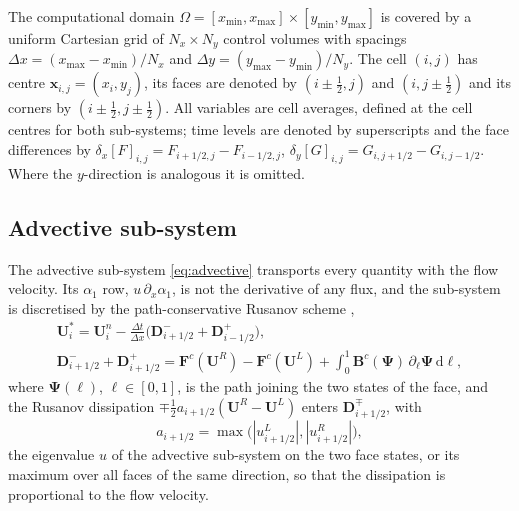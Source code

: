 The computational domain $\Omega=[x_{\min},x_{\max}]\times[y_{\min},y_{\max}]$ is covered by a uniform Cartesian grid of
$N_x\times N_y$ control volumes with spacings $\Delta x=(x_{\max}-x_{\min})/N_x$ and $\Delta y=(y_{\max}-y_{\min})/N_y$. The cell $(i,j)$ has
centre $\mathbf x_{i,j}=(x_i,y_j)$, its faces are denoted by $(i\pm\tfrac12,j)$ and $(i,j\pm\tfrac12)$ and its corners by
$(i\pm\tfrac12,j\pm\tfrac12)$. All variables are cell averages, defined at the cell centres for both sub-systems; time levels
are denoted by superscripts and the face differences by $\delta_x[F]_{i,j}=F_{i+1/2,j}-F_{i-1/2,j}$,
$\delta_y[G]_{i,j}=G_{i,j+1/2}-G_{i,j-1/2}$. Where the $y$-direction is analogous it is omitted.

\subsection{Advective sub-system}
\label{sec:advective}
The advective sub-system \eqref{eq:advective} transports every quantity with the flow velocity. Its $\alpha_1$ row,
$u\,\partial_x\alpha_1$, is not the derivative of any flux, and the sub-system is discretised by the path-conservative Rusanov scheme
\cite{DalMaso1995,Pares2006,Castro2006},
\begin{equation}
\begin{gathered}
\mathbf U^*_i=\mathbf U^n_i-\frac{\Delta t}{\Delta x}\Big(\mathbf D^-_{i+1/2}+\mathbf D^+_{i-1/2}\Big),\\
\mathbf D^-_{i+1/2}+\mathbf D^+_{i+1/2}=\mathbf F^c(\mathbf U^R)-\mathbf F^c(\mathbf U^L)+\int_0^1\mathbf B^c(\boldsymbol\Psi)\,\partial_\ell\boldsymbol\Psi\,\mathrm d\ell ,
\end{gathered}
\label{eq:pc_update}
\end{equation}
where $\boldsymbol\Psi(\ell)$, $\ell\in[0,1]$, is the path joining the two states of the face, and the Rusanov dissipation
$\mp\tfrac12a_{i+1/2}(\mathbf U^R-\mathbf U^L)$ enters $\mathbf D^\mp_{i+1/2}$, with
\begin{equation}
a_{i+1/2}=\max\big(|u^L_{i+1/2}|,|u^R_{i+1/2}|\big),
\label{eq:rusanov_speed}
\end{equation}
the eigenvalue $u$ of the advective sub-system on the two face states, or its maximum over all faces of the same
direction, so that the dissipation is proportional to the flow velocity.

